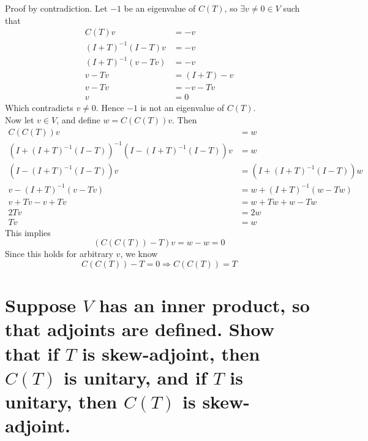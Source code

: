 \documentclass[answers]{exam}
\begin{document}
\begin{questions}
\begin{parts}
	\begin{solution}
		Proof by contradiction. Let $-1$ be an eigenvalue of $C(T)$, so $\exists v \neq 0 \in V$ such that
		\begin{align*}
			C(T)v &= -v \\
			(I+T)^{-1}(I-T)v &= -v \\
			(I+T)^{-1}(v-Tv) &= -v \\
			v-Tv &= (I+T)-v \\
			v-Tv &= -v-Tv \\
			v &= 0
		\end{align*}
		Which contradicts $v \neq 0$. Hence $-1$ is not an eigenvalue of $C(T)$. \\
		Now let $v \in V$, and define $w = C(C(T))v$. Then
		\begin{align*}
			C(C(T))v &= w \\
			\left(I+(I+T)^{-1}(I-T)\right)^{-1}\left(I-(I+T)^{-1}(I-T)\right)v &= w \\
			\left(I-(I+T)^{-1}(I-T)\right)v &= \left(I+(I+T)^{-1}(I-T)\right)w \\
			v - (I+T)^{-1}(v-Tv) &= w + (I+T)^{-1}(w-Tw) \\
			v + Tv - v + Tv &= w + Tw + w - Tw \\
			2Tv &= 2w \\
			Tv &= w
		\end{align*}
		This implies
		$$(C(C(T))-T)v = w-w = 0$$
		Since this holds for arbitrary $v$, we know
		$$C(C(T)) - T = 0 \Rightarrow C(C(T)) = T$$
	\end{solution}

	\part{Suppose $V$ has an inner product, so that adjoints are defined. Show that if $T$ is skew-adjoint, then $C(T)$ is unitary, and if $T$ is unitary, then $C(T)$ is skew-adjoint.}


\end{parts}
\end{questions}
\end{document}
